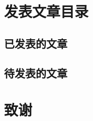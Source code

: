 \chapter{发表文章目录}

\section*{已发表的文章}
\begin{refsection}
    \nocite{Huang2018,Feng2020a}
    \printbibliography[heading=none,resetnumbers=false]
\end{refsection}

\section*{待发表的文章}
\begin{refsection}
    \nocite{Huang2018a,Huang2019,Chen2019,Feng2020}
    \printbibliography[heading=none,resetnumbers=false]
\end{refsection}

\chapter[致谢]{致\quad 谢}%
\thispagestyle{noheaderstyle}%



\cleardoublepage[plain]%

